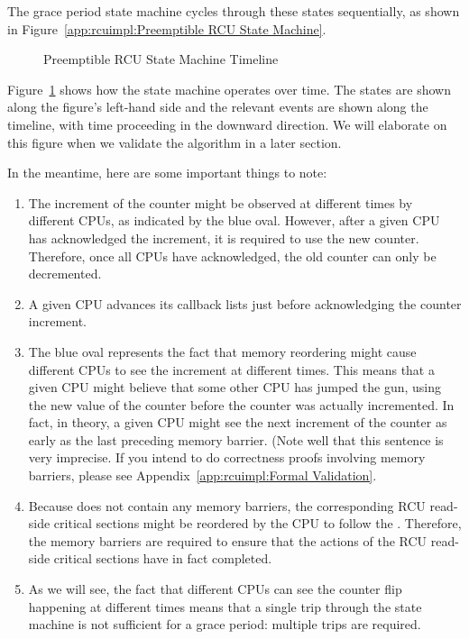 The grace period state machine cycles through these states sequentially,
as shown in
Figure~\ref{app:rcuimpl:Preemptible RCU State Machine}.

\begin{figure}[htb]
\centering
{}
\caption{Preemptible RCU State Machine Timeline}
\label{app:rcuimpl:Preemptible RCU State Machine Timeline}
\end{figure}

Figure~\ref{app:rcuimpl:Preemptible RCU State Machine Timeline}
shows how the state machine operates over time.
The states are shown along the figure's left-hand side and the relevant events
are shown along the timeline, with time proceeding in the downward direction.
We will elaborate on this figure when we validate the algorithm in
a later section.

In the meantime, here are some important things to note:

\begin{enumerate}
\item	The increment of the  counter
	might be observed at different times by different CPUs, as
	indicated by the blue oval.  However, after a given
	CPU has acknowledged the increment, it is required to
	use the new counter.
	Therefore, once all CPUs have acknowledged, the old counter
	can only be decremented.
\item	A given CPU advances its callback lists just before
	acknowledging the counter increment.
\item	The blue oval represents the fact that memory reordering
	might cause different CPUs to see the increment at
	different times.
	This means that a given CPU might believe that some
	other CPU has jumped the gun, using the new value of the counter
	before the counter was actually incremented.
	In fact, in theory, a given CPU might see the next increment of the
	 counter as early as
	the last preceding memory barrier.
	(Note well that this sentence is very imprecise.
	If you intend to do correctness proofs involving memory barriers,
	please see Appendix~\ref{app:rcuimpl:Formal Validation}.
\item	Because  does not contain any
	memory barriers, the corresponding RCU read-side critical
	sections might be reordered by the CPU to follow the
	.
	Therefore, the memory barriers are required to ensure
	that the actions of the RCU read-side critical sections
	have in fact completed.
\item	As we will see, the fact that different CPUs can see the
	counter flip happening at different times means that a
	single trip through the state machine is not sufficient
	for a grace period: multiple trips are required.
\end{enumerate}

